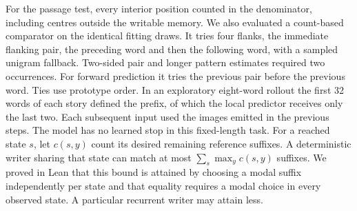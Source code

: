 For the passage test, every interior position counted in the denominator, including centres outside the writable memory. We also evaluated a count-based comparator on the identical fitting draws. It tries four flanks, the immediate flanking pair, the preceding word and then the following word, with a sampled unigram fallback. Two-sided pair and longer pattern estimates required two occurrences. For forward prediction it tries the previous pair before the previous word. Ties use prototype order. In an exploratory eight-word rollout the first 32 words of each story defined the prefix, of which the local predictor receives only the last two. Each subsequent input used the images emitted in the previous steps. The model has no learned stop in this fixed-length task. For a reached state $s$, let $c(s,y)$ count its desired remaining reference suffixes. A deterministic writer sharing that state can match at most $\sum_s\max_y c(s,y)$ suffixes. We proved in Lean that this bound is attained by choosing a modal suffix independently per state and that equality requires a modal choice in every observed state. A particular recurrent writer may attain less.
